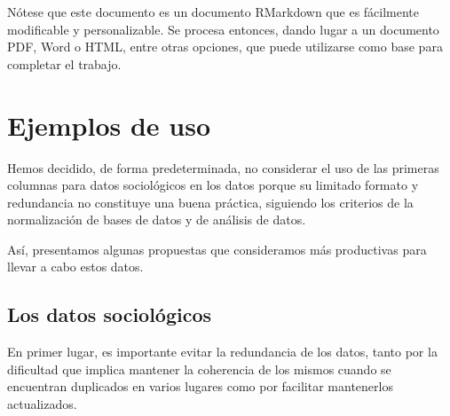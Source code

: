\documentclass[
]{article}
\newenvironment{Shaded}{\begin{snugshade}}{\end{snugshade}}
\newcommand{\DataTypeTok}[1]{\textcolor[rgb]{0.13,0.29,0.53}{#1}}
\newcommand{\KeywordTok}[1]{\textcolor[rgb]{0.13,0.29,0.53}{\textbf{#1}}}
\newcommand{\NormalTok}[1]{#1}
\newcommand{\OperatorTok}[1]{\textcolor[rgb]{0.81,0.36,0.00}{\textbf{#1}}}
\newcommand{\StringTok}[1]{\textcolor[rgb]{0.31,0.60,0.02}{#1}}
\begin{document}
Nótese que este documento es un documento RMarkdown que es fácilmente
modificable y personalizable. Se procesa entonces, dando lugar a un
documento PDF, Word o HTML, entre otras opciones, que puede utilizarse
como base para completar el trabajo.

\hypertarget{ejemplos-de-uso}{%
\section{Ejemplos de uso}\label{ejemplos-de-uso}}

Hemos decidido, de forma predeterminada, no considerar el uso de las
primeras columnas para datos sociológicos en los datos porque su
limitado formato y redundancia no constituye una buena práctica,
siguiendo los criterios de la normalización de bases de datos y de
análisis de datos.

Así, presentamos algunas propuestas que consideramos más productivas
para llevar a cabo estos datos.

\hypertarget{los-datos-socioluxf3gicos}{%
\subsection{Los datos sociológicos}\label{los-datos-socioluxf3gicos}}

En primer lugar, es importante evitar la redundancia de los datos, tanto
por la dificultad que implica mantener la coherencia de los mismos
cuando se encuentran duplicados en varios lugares como por facilitar
mantenerlos actualizados.

\begin{Shaded}
\end{Shaded}

\begin{Shaded}
\end{Shaded}
\end{document}
